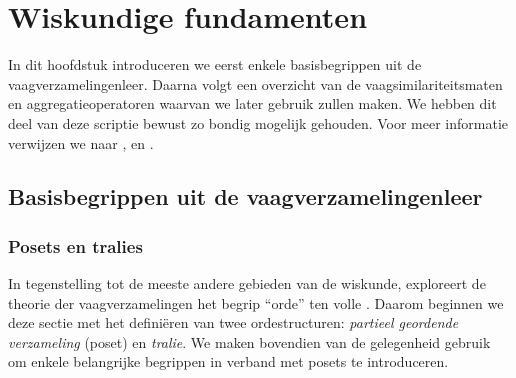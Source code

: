 \chapter{Wiskundige fundamenten}

In dit hoofdstuk introduceren we eerst enkele basisbegrippen uit de vaagverzamelingenleer. 
Daarna volgt een overzicht van de vaagsimilariteitsmaten en aggregatieoperatoren waarvan
we later gebruik zullen maken. We hebben dit deel van deze scriptie bewust zo 
bondig mogelijk gehouden. Voor meer informatie verwijzen
we naar \cite{kerre:vaagmodellen}, \cite{vanderweken:similariteitsmaten} en 
\cite{victor:aggregatieoperatoren}.


\section{Basisbegrippen uit de vaagverzamelingenleer}

\subsection{Posets en tralies}
\label{sectie:posets_en_tralies}

In tegenstelling tot de meeste andere gebieden van de wiskunde, exploreert de theorie der 
vaagverzamelingen het begrip ``orde'' ten volle \cite{kerre:vaagmodellen}. Daarom beginnen we deze 
sectie met het defini\"eren van twee ordestructuren: \emph{partieel geordende verzameling} 
(poset) en \emph{tralie}. We maken bovendien van de gelegenheid gebruik om enkele 
belangrijke begrippen in verband met posets te introduceren. 

